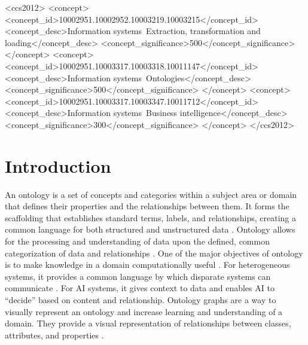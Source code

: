 \documentclass[sigconf]{acmart}
\begin{document}
\begin{CCSXML}
	<ccs2012>
	<concept>
	<concept_id>10002951.10002952.10003219.10003215</concept_id>
	<concept_desc>Information systems~Extraction, transformation and loading</concept_desc>
	<concept_significance>500</concept_significance>
	</concept>
	<concept>
	<concept_id>10002951.10003317.10003318.10011147</concept_id>
	<concept_desc>Information systems~Ontologies</concept_desc>
	<concept_significance>500</concept_significance>
	</concept>
	<concept>
	<concept_id>10002951.10003317.10003347.10011712</concept_id>
	<concept_desc>Information systems~Business intelligence</concept_desc>
	<concept_significance>300</concept_significance>
	</concept>
	</ccs2012>
\end{CCSXML}



\maketitle

\section{Introduction}
An ontology is a set of concepts and categories within a subject area or domain that defines their properties and the relationships between them. It forms the scaffolding that establishes standard terms, labels, and relationships, creating a common language for both structured and unstructured data \cite{gruber1993ontology, chari2020explanation}. Ontology allows for the processing and understanding of data upon the defined, common categorization of data and relationships \cite{yue2023csm}. One of the major objectives of ontology is to make knowledge in a domain computationally useful \cite{tudorache2020ontology}. For heterogeneous systems, it provides a common language by which disparate systems can communicate \cite{fraga2020ontology, yue2023csm}. For AI systems, it gives context to data and enables AI to “decide” based on content and relationship. Ontology graphs are a way to visually represent an ontology and increase learning and understanding of a domain. They provide a visual representation of relationships between classes, attributes, and properties \cite{gutierrez2018knowledge, yue2021applying}.
\end{document}

